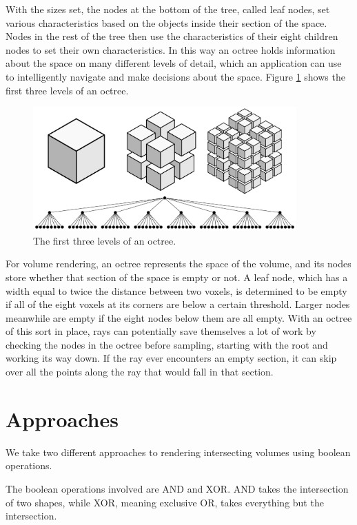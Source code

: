 \documentclass{article}
\begin{document}
With the sizes set, the nodes at the bottom of the tree, called leaf nodes, set
various characteristics based on the objects inside their section of the space.
Nodes in the rest of the tree then use the characteristics of their eight
children nodes to set their own characteristics.  In this way an octree holds
information about the space on many different levels of detail, which an
application can use to intelligently navigate and make decisions about the
space.  Figure \ref{octree} shows the first three levels of an octree.

\begin{figure}
\centering
\includegraphics[width=0.9\textwidth]{octree.pdf}
\caption{The first three levels of an octree.}
\label{octree}
\end{figure}

For volume rendering, an octree represents the space of the volume, and its
nodes store whether that section of the space is empty or not.  A leaf node,
which has a width equal to twice the distance between two voxels, is determined
to be empty if all of the eight voxels at its corners are below a certain
threshold.  Larger nodes meanwhile are empty if the eight nodes below them are
all empty.  With an octree of this sort in place, rays can potentially save
themselves a lot of work by checking the nodes in the octree before sampling,
starting with the root and working its way down.  If the ray ever encounters an
empty section, it can skip over all the points along the ray that would fall in
that section.

\section{Approaches}

We take two different approaches to rendering intersecting volumes using boolean
operations.

The boolean operations involved are AND and XOR.  AND takes the intersection of
two shapes, while XOR, meaning exclusive OR, takes everything but the
intersection.
\end{document}
